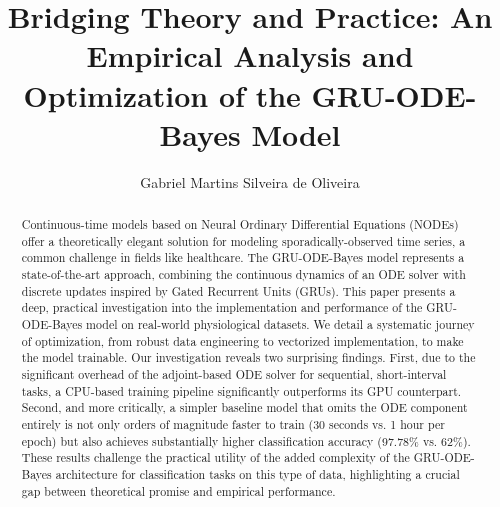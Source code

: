 \documentclass[sigconf]{acmart}
\begin{document}
\title{{Bridging Theory and Practice: An Empirical Analysis and Optimization of the GRU-ODE-Bayes Model}}



\author{Gabriel Martins Silveira de Oliveira}


\begin{abstract}
Continuous-time models based on Neural Ordinary Differential Equations (NODEs) offer a theoretically 
elegant solution for modeling sporadically-observed time series, a common challenge in fields like healthcare. 
The GRU-ODE-Bayes model represents a state-of-the-art approach, combining the continuous dynamics of an ODE solver with 
discrete updates inspired by Gated Recurrent Units (GRUs). 
This paper presents a deep, practical investigation into the implementation and performance of the GRU-ODE-Bayes model on 
real-world physiological datasets. 
We detail a systematic journey of optimization, from robust data engineering to vectorized implementation, 
to make the model trainable. Our investigation reveals two surprising findings. 
First, due to the significant overhead of the adjoint-based ODE solver for sequential, short-interval tasks, 
a CPU-based training pipeline significantly outperforms its GPU counterpart. 
Second, and more critically, a simpler baseline model that omits the ODE component entirely is not only 
orders of magnitude faster to train (30 seconds vs. 1 hour per epoch) but also achieves substantially higher 
classification accuracy (97.78\% vs. 62\%). 
These results challenge the practical utility of the added complexity of the GRU-ODE-Bayes architecture for 
classification tasks on this type of data, highlighting a crucial gap between theoretical promise and empirical performance.
\end{abstract}
\end{document}
